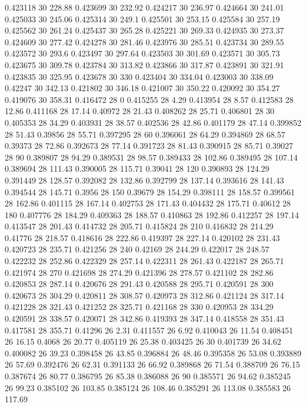 0.423118 30 228.88
0.423699 30 232.92
0.424217 30 236.97
0.424664 30 241.01
0.425033 30 245.06
0.425314 30 249.1
0.425501 30 253.15
0.425584 30 257.19
0.425562 30 261.24
0.425437 30 265.28
0.425221 30 269.33
0.424935 30 273.37
0.424609 30 277.42
0.424278 30 281.46
0.423976 30 285.51
0.423734 30 289.55
0.423572 30 293.6
0.423497 30 297.64
0.423503 30 301.69
0.423571 30 305.73
0.423675 30 309.78
0.423784 30 313.82
0.423866 30 317.87
0.423891 30 321.91
0.423835 30 325.95
0.423678 30 330
0.423404 30 334.04
0.423003 30 338.09
0.42247 30 342.13
0.421802 30 346.18
0.421007 30 350.22
0.420092 30 354.27
0.419076 30 358.31
0.416472 28 0
0.415255 28 4.29
0.413954 28 8.57
0.412583 28 12.86
0.411168 28 17.14
0.40972 28 21.43
0.408262 28 25.71
0.406801 28 30
0.405353 28 34.29
0.403931 28 38.57
0.402536 28 42.86
0.401179 28 47.14
0.399852 28 51.43
0.39856 28 55.71
0.397295 28 60
0.396061 28 64.29
0.394869 28 68.57
0.39373 28 72.86
0.392673 28 77.14
0.391723 28 81.43
0.390915 28 85.71
0.39027 28 90
0.389807 28 94.29
0.389531 28 98.57
0.389433 28 102.86
0.389495 28 107.14
0.389694 28 111.43
0.390005 28 115.71
0.39041 28 120
0.390893 28 124.29
0.391449 28 128.57
0.392082 28 132.86
0.392799 28 137.14
0.393616 28 141.43
0.394544 28 145.71
0.3956 28 150
0.39679 28 154.29
0.398111 28 158.57
0.399561 28 162.86
0.401115 28 167.14
0.402753 28 171.43
0.404432 28 175.71
0.40612 28 180
0.407776 28 184.29
0.409363 28 188.57
0.410863 28 192.86
0.412257 28 197.14
0.413547 28 201.43
0.414732 28 205.71
0.415824 28 210
0.416832 28 214.29
0.41776 28 218.57
0.418616 28 222.86
0.419397 28 227.14
0.420102 28 231.43
0.420723 28 235.71
0.421256 28 240
0.42169 28 244.29
0.422017 28 248.57
0.422232 28 252.86
0.422329 28 257.14
0.422311 28 261.43
0.422187 28 265.71
0.421974 28 270
0.421698 28 274.29
0.421396 28 278.57
0.421102 28 282.86
0.420853 28 287.14
0.420676 28 291.43
0.420588 28 295.71
0.420591 28 300
0.420673 28 304.29
0.420811 28 308.57
0.420973 28 312.86
0.421124 28 317.14
0.421228 28 321.43
0.421252 28 325.71
0.421168 28 330
0.420953 28 334.29
0.420591 28 338.57
0.420071 28 342.86
0.419393 28 347.14
0.418558 28 351.43
0.417581 28 355.71
0.41296 26 2.31
0.411557 26 6.92
0.410043 26 11.54
0.408451 26 16.15
0.4068 26 20.77
0.405119 26 25.38
0.403425 26 30
0.401739 26 34.62
0.400082 26 39.23
0.398458 26 43.85
0.396884 26 48.46
0.395358 26 53.08
0.393889 26 57.69
0.392476 26 62.31
0.391133 26 66.92
0.389868 26 71.54
0.388709 26 76.15
0.387674 26 80.77
0.386795 26 85.38
0.386088 26 90
0.385571 26 94.62
0.385245 26 99.23
0.385102 26 103.85
0.385124 26 108.46
0.385291 26 113.08
0.385583 26 117.69
